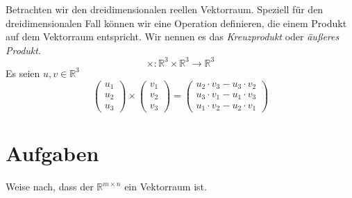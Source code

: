 Betrachten wir den dreidimensionalen reellen Vektorraum. Speziell für den dreidimensionalen Fall können wir eine Operation definieren, die einem Produkt auf dem Vektorraum entspricht. Wir nennen es das \textsl{Kreuzprodukt} oder \textsl{äußeres Produkt}. 
\begin{equation*}
\times : \mathbb{R}^3 \times \mathbb{R}^3 \longrightarrow \mathbb{R}^3
\end{equation*}
Es seien $u,v\in \mathbb{R}^3$
\begin{equation*}
\begin{pmatrix}
u_1\\u_2\\u_3
\end{pmatrix} \times 
\begin{pmatrix}
v_1\\v_2\\v_3
\end{pmatrix}  = \begin{pmatrix}
u_2\cdot v_3-u_3\cdot v_2 \\
u_3\cdot v_1-u_1\cdot v_3 \\
u_1\cdot v_2-u_2\cdot v_1
\end{pmatrix}
\end{equation*}


\section{Aufgaben}

\begin{prob}
\label{matrix.1}

Weise nach, dass der $\mathbb{R}^{m\times n}$ ein Vektorraum ist. 

\end{prob}


